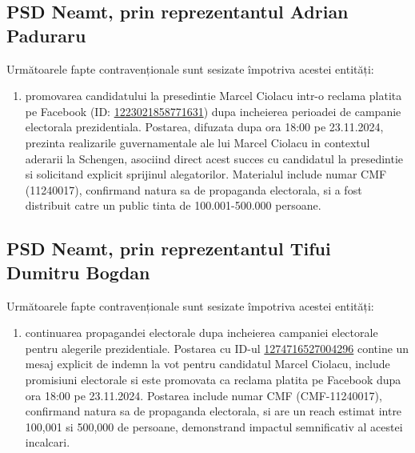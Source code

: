 \documentclass[a4paper,12pt]{article}
\begin{document}
\vspace{0.5cm}

\subsection{PSD Neamt, prin reprezentantul Adrian Paduraru}
Următoarele fapte contravenționale sunt sesizate împotriva acestei entități:

\begin{enumerate}[leftmargin=*, label=\arabic*.)]
    \item promovarea candidatului la presedintie Marcel Ciolacu intr-o reclama platita pe Facebook (ID: \href{https://www.facebook.com/ads/library/?id=1223021858771631}{1223021858771631}) dupa incheierea perioadei de campanie electorala prezidentiala. Postarea, difuzata dupa ora 18:00 pe 23.11.2024, prezinta realizarile guvernamentale ale lui Marcel Ciolacu in contextul aderarii la Schengen, asociind direct acest succes cu candidatul la presedintie si solicitand explicit sprijinul alegatorilor. Materialul include numar CMF (11240017), confirmand natura sa de propaganda electorala, si a fost distribuit catre un public tinta de 100.001-500.000 persoane.
\end{enumerate}

\vspace{0.5cm}

\subsection{PSD Neamt, prin reprezentantul Tifui Dumitru Bogdan}
Următoarele fapte contravenționale sunt sesizate împotriva acestei entități:

\begin{enumerate}[leftmargin=*, label=\arabic*.)]
    \item continuarea propagandei electorale dupa incheierea campaniei electorale pentru alegerile prezidentiale. Postarea cu ID-ul \href{https://www.facebook.com/ads/library/?id=1274716527004296}{1274716527004296} contine un mesaj explicit de indemn la vot pentru candidatul Marcel Ciolacu, include promisiuni electorale si este promovata ca reclama platita pe Facebook dupa ora 18:00 pe 23.11.2024. Postarea include numar CMF (CMF-11240017), confirmand natura sa de propaganda electorala, si are un reach estimat intre 100,001 si 500,000 de persoane, demonstrand impactul semnificativ al acestei incalcari.
\end{enumerate}

\vspace{0.5cm}
\end{document}
